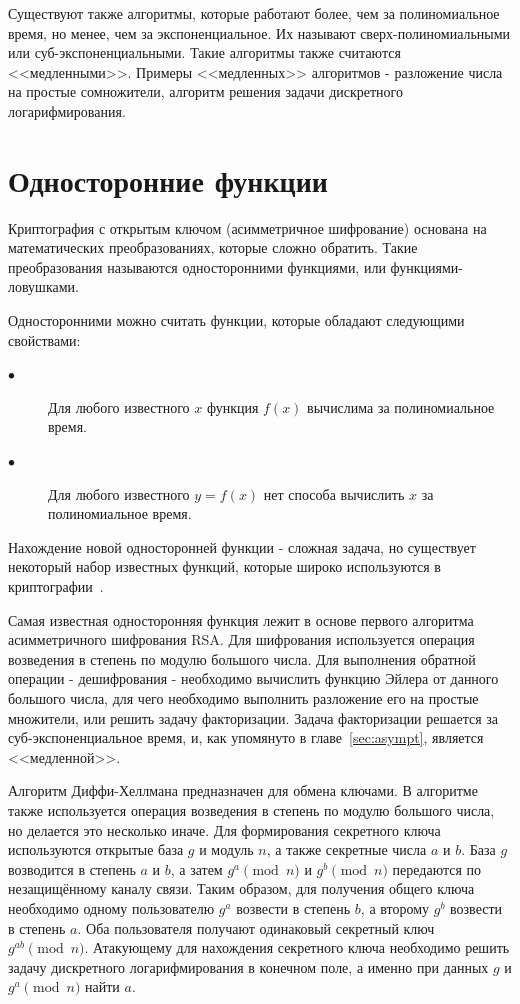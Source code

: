 \documentclass[times,specification,annotation]{itmo-student-thesis}
\begin{document}
Существуют также алгоритмы, которые работают более, чем за полиномиальное время, но менее, чем за экспоненциальное.
Их называют сверх-полиномиальными или суб-экспоненциальными.
Такие алгоритмы также считаются <<медленными>>.
Примеры <<медленных>> алгоритмов - разложение числа на простые сомножители, алгоритм решения задачи
дискретного логарифмирования.

\section{Односторонние функции}\label{sec:func}

Криптография с открытым ключом (асимметричное шифрование) основана на математических преобразованиях, которые сложно обратить.
Такие преобразования называются односторонними функциями, или функциями-ловушками.

Односторонними можно считать функции, которые обладают следующими свойствами:
\begin{description}
  \item[$\bullet$] Для любого известного $x$ функция $f(x)$ вычислима за полиномиальное время.
  \item[$\bullet$] Для любого известного $y=f(x)$ нет способа вычислить $x$ за полиномиальное время.
\end{description}
Нахождение новой односторонней функции - сложная задача, но существует некоторый набор известных функций,
которые широко используются в криптографии~\cite{sma15, men01}.\par
Самая известная односторонняя функция лежит в основе первого алгоритма асимметричного шифрования RSA\@.
Для шифрования используется операция возведения в степень по модулю большого числа.
Для выполнения обратной операции - дешифрования - необходимо вычислить функцию Эйлера
от данного большого числа, для чего необходимо выполнить разложение его на простые множители, или решить задачу факторизации.
Задача факторизации решается за суб-экспоненциальное время, и, как упомянуто в главе~\ref{sec:asympt}, является <<медленной>>.

Алгоритм Диффи-Хеллмана предназначен для обмена ключами.
В алгоритме также используется операция возведения в степень по модулю большого числа, но делается это несколько иначе.
Для формирования секретного ключа используются открытые база $g$ и модуль $n$, а также секретные числа $a$ и $b$.
База $g$ возводится в степень $a$ и $b$, а затем $g^a\pmod{n}$ и $g^b\pmod{n}$ передаются по незащищённому каналу связи.
Таким образом, для получения общего ключа необходимо одному пользователю $g^a$ возвести в степень $b$,
а второму $g^b$ возвести в степень $a$.
Оба пользователя получают одинаковый секретный ключ $g^{ab}\pmod{n}$.
Атакующему для нахождения секретного ключа необходимо решить задачу дискретного логарифмирования в конечном поле,
а именно при данных $g$ и $g^a\pmod{n}$ найти $a$.
\end{document}
